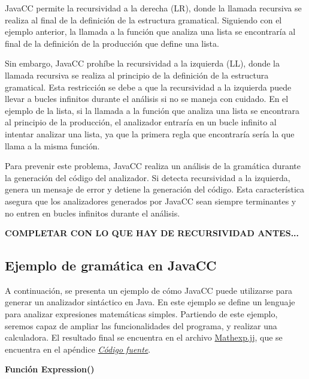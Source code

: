 JavaCC permite la recursividad a la derecha (LR), donde la llamada recursiva se realiza al final de la definición de la estructura gramatical. Siguiendo con el ejemplo anterior, la llamada a la función que analiza una lista se encontraría al final de la definición de la producción que define una lista.

Sin embargo, JavaCC prohíbe la recursividad a la izquierda (LL), donde la llamada recursiva se realiza al principio de la definición de la estructura gramatical. Esta restricción se debe a que la recursividad a la izquierda puede llevar a bucles infinitos durante el análisis si no se maneja con cuidado. En el ejemplo de la lista, si la llamada a la función que analiza una lista se encontrara al principio de la producción, el analizador entraría en un bucle infinito al intentar analizar una lista, ya que la primera regla que encontraría sería la que llama a la misma función.

Para prevenir este problema, JavaCC realiza un análisis de la gramática durante la generación del código del analizador. Si detecta recursividad a la izquierda, genera un mensaje de error y detiene la generación del código. Esta característica asegura que los analizadores generados por JavaCC sean siempre terminantes y no entren en bucles infinitos durante el análisis.

\textbf{COMPLETAR CON LO QUE HAY DE RECURSIVIDAD ANTES...}


\subsection{Ejemplo de gramática en JavaCC}
\noindent A continuación, se presenta un ejemplo de cómo JavaCC puede utilizarse para generar un analizador sintáctico en Java. En este ejemplo se define un lenguaje para analizar expresiones matemáticas simples. Partiendo de este ejemplo, seremos capaz de ampliar las funcionalidades del programa, y realizar una calculadora. El resultado final se encuentra en el archivo \hyperref[sec:mathexp]{Mathexp.jj}, que se encuentra en el apéndice \hyperref[sec:codigofuente]{\textit{Código fuente}}.

\phantom{text}

\noindent \textbf{Función Expression()}

\phantom{text}

\lstset{inputencoding=utf8/latin1}


